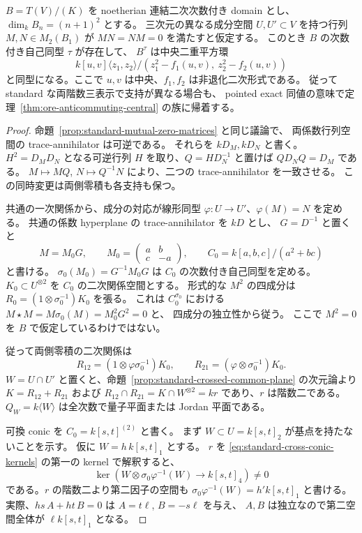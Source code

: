 \begin{theorem}
\label{thm:standard-distinct-untwist}
$B=T(V)/(K)$ を noetherian 連結二次次数付き domain とし、
$\dim_kB_n=(n+1)^2$ とする。
三次元の異なる成分空間 $U,U'\subset V$ を持つ行列
$M,N\in M_2(B_1)$ が $MN=NM=0$ を満たすと仮定する。
このとき $B$ の次数付き自己同型 $\tau$ が存在して、
$B^\tau$ は中央二重平方環
\[
 k[u,v]\langle z_1,z_2\rangle/
 (z_1^2-f_1(u,v),\ z_2^2-f_2(u,v))
\]
と同型になる。ここで $u,v$ は中央、$f_1,f_2$ は非退化二次形式である。
従って standard な両階数三表示で支持が異なる場合も、
pointed exact 同値の意味で定理~\ref{thm:ore-anticommuting-central} の族に帰着する。
\end{theorem}
\begin{proof}
命題~\ref{prop:standard-mutual-zero-matrices} と同じ議論で、
両係数行列空間の trace-annihilator は可逆である。
それらを $kD_M,kD_N$ と書く。
$H^2=D_MD_N$ となる可逆行列 $H$ を取り、$Q=HD_N^{-1}$ と置けば
$QD_NQ=D_M$ である。
$M\mapsto MQ$, $N\mapsto Q^{-1}N$ により、二つの trace-annihilator を一致させる。
この同時変更は両側零積も各支持も保つ。

共通の一次関係から、成分の対応が線形同型
$\varphi:U\to U'$、$\varphi(M)=N$ を定める。
共通の係数 hyperplane の trace-annihilator を $kD$ とし、
$G=D^{-1}$ と置くと
\[
 M=M_0G,\qquad
 M_0=\begin{pmatrix}a&b\\c&-a\end{pmatrix},\qquad
 C_0=k[a,b,c]/(a^2+bc)
\]
と書ける。
$\sigma_0(M_0)=G^{-1}M_0G$ は $C_0$ の次数付き自己同型を定める。
$K_0\subset U^{\otimes2}$ を $C_0$ の二次関係空間とする。
形式的な $M^2$ の四成分は
$R_0=(1\otimes\sigma_0^{-1})K_0$ を張る。
これは $C_0^{\sigma_0}$ における
$M\star M=M\sigma_0(M)=M_0^2G^2=0$ と、
四成分の独立性から従う。
ここで $M^2=0$ を $B$ で仮定しているわけではない。

従って両側零積の二次関係は
\begin{equation}
 R_{12}=(1\otimes\varphi\sigma_0^{-1})K_0,
 \qquad
 R_{21}=(\varphi\otimes\sigma_0^{-1})K_0.
 \label{eq:standard-cross-conic-kernels}
\end{equation}
$W=U\cap U'$ と置くと、命題~\ref{prop:standard-crossed-common-plane} の次元論より
$K=R_{12}+R_{21}$ および
$R_{12}\cap R_{21}=K\cap W^{\otimes2}=kr$ であり、$r$ は階数二である。
$Q_W=k\langle W\rangle$ は全次数で量子平面または Jordan 平面である。

可換 conic を $C_0=k[s,t]^{(2)}$ と書く。
まず $W\subset U=k[s,t]_2$ が基点を持たないことを示す。
仮に $W=h\,k[s,t]_1$ とする。
$r$ を \eqref{eq:standard-cross-conic-kernels} の第一の kernel で解釈すると、
\[
 \ker\left(W\otimes\sigma_0\varphi^{-1}(W)
       \longrightarrow k[s,t]_4\right)\ne0
\]
である。$r$ の階数二より第二因子の空間も
$\sigma_0\varphi^{-1}(W)=h'k[s,t]_1$ と書ける。
実際、$hs\,A+ht\,B=0$ は $A=t\ell$, $B=-s\ell$ を与え、
$A,B$ は独立なので第二空間全体が $\ell k[s,t]_1$ となる。


\end{proof}
